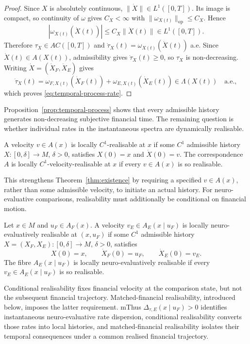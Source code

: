 \documentclass[graybox,natbib]{SNmult}
\providecommand{\1}{}
\renewcommand{\1}{\mathbbm 1}
\begin{document}
\begin{proof}
Since \(X\) is absolutely continuous, \(\|\dot X\|\in L^1([0,T])\).
Its image is compact, so continuity of \(\omega\) gives \(C_X<\infty\) with
\(\|\omega_{X(t)}\|_{\mathrm{op}}\leq C_X\). Hence
\[
|\omega_{X(t)}(\dot X(t))|
\leq C_X\|\dot X(t)\|
\in L^1([0,T]).
\]
Therefore \(\tau_X\in AC([0,T])\) and
\(\dot\tau_X(t)=\omega_{X(t)}(\dot X(t))\) a.e. Since
\(\dot X(t)\in A(X(t))\), admissibility gives
\(\dot\tau_X(t)\geq0\), so \(\tau_X\) is non-decreasing. Writing \(\dot X=(\dot X_F,\dot X_E)\) gives
\[
\dot\tau_X(t)
=
\omega_{F,X(t)}(\dot X_F(t))
+
\omega_{E,X(t)}(\dot X_E(t))
\in\Lambda(X(t))
\quad\text{a.e.},
\]
which proves \eqref{eq:temporal-process-rate}.
\end{proof}

Proposition~\ref{prop:temporal-process} shows that every admissible history
generates non-decreasing subjective financial time. The remaining question is
whether individual rates in the instantaneous spectra are dynamically
realisable.

\begin{definition}
\label{def:velocity-realisability}
A velocity \(v\in A(x)\) is locally \(C^1\)-realisable at \(x\) if some
\(C^1\) admissible history \(X:[0,\delta]\to M\), \(\delta>0\), satisfies
\(X(0)=x\) and \(\dot X(0)=v\). The correspondence \(A\) is locally
\(C^1\)-velocity-realisable at \(x\) if every \(v\in A(x)\) is so realisable.
\end{definition}

This strengthens Theorem~\ref{thm:existence} by requiring a specified
\(v\in A(x)\), rather than some admissible velocity, to initiate an actual
history. For neuro-evaluative comparisons, realisability must additionally be
conditional on financial motion.

\begin{definition}
\label{def:neuro-realisability}
Let \(x\in M\) and \(u_F\in A_F(x)\). A velocity
\(v_E\in A_E(x\mid u_F)\) is locally neuro-evaluatively realisable at
\((x,u_F)\) if some \(C^1\) admissible history
\(X=(X_F,X_E):[0,\delta]\to M\), \(\delta>0\), satisfies
\[
X(0)=x,
\qquad
\dot X_F(0)=u_F,
\qquad
\dot X_E(0)=v_E.
\]
The fibre \(A_E(x\mid u_F)\) is locally neuro-evaluatively realisable if every
\(v_E\in A_E(x\mid u_F)\) is so realisable.
\end{definition}

Conditional realisability fixes financial velocity at the comparison state,
but not the subsequent financial trajectory. Matched-financial realisability,
introduced below, imposes the latter requirement. mThus \(\Delta_{\tau,E}(x\mid u_F)>0\) identifies instantaneous
neuro-evaluative rate dispersion, conditional realisability converts those
rates into local histories, and matched-financial realisability isolates their
temporal consequences under a common realised financial trajectory.
\end{document}
